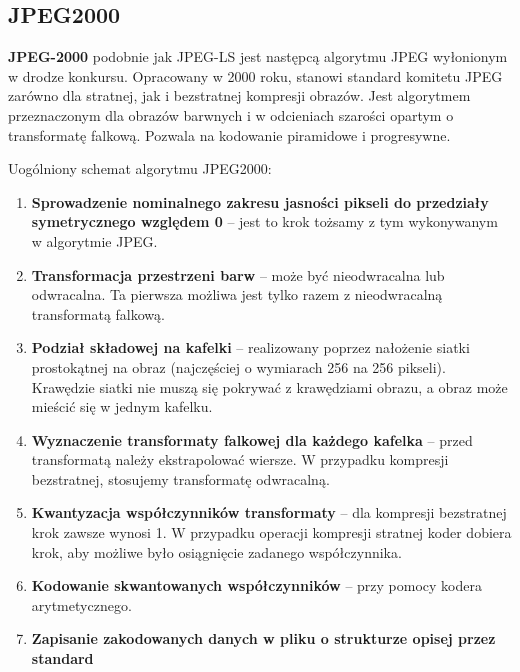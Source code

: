 \subsection{JPEG2000}

\textbf{JPEG-2000} podobnie jak JPEG-LS jest następcą algorytmu JPEG wyłonionym w drodze konkursu. Opracowany w 2000 roku, stanowi standard komitetu JPEG zarówno dla stratnej, jak i bezstratnej kompresji obrazów. Jest algorytmem przeznaczonym dla obrazów barwnych i w odcieniach szarości opartym o transformatę falkową. Pozwala na kodowanie piramidowe i progresywne.

Uogólniony schemat algorytmu JPEG2000:

\begin{enumerate}
	\item \textbf{Sprowadzenie nominalnego zakresu jasności pikseli do przedziały symetrycznego względem 0} -- jest to krok tożsamy z tym wykonywanym w algorytmie JPEG.
	\item \textbf{Transformacja przestrzeni barw} -- może być nieodwracalna lub odwracalna. Ta pierwsza możliwa jest tylko razem z nieodwracalną transformatą falkową.
	\item \textbf{Podział składowej na kafelki} -- realizowany poprzez nałożenie siatki prostokątnej na obraz (najczęściej o wymiarach 256 na 256 pikseli). Krawędzie siatki nie muszą się pokrywać z krawędziami obrazu, a obraz może mieścić się w jednym kafelku.
	\item \textbf{Wyznaczenie transformaty falkowej dla każdego kafelka} -- przed transformatą należy ekstrapolować wiersze. W przypadku kompresji bezstratnej, stosujemy transformatę odwracalną.
	\item \textbf{Kwantyzacja współczynników transformaty} -- dla kompresji bezstratnej krok zawsze wynosi 1. W przypadku operacji kompresji stratnej koder dobiera krok, aby możliwe było osiągnięcie zadanego współczynnika.
	\item \textbf{Kodowanie skwantowanych współczynników} -- przy pomocy kodera arytmetycznego.
	\item \textbf{Zapisanie zakodowanych danych w pliku o strukturze opisej przez standard}
\end{enumerate}